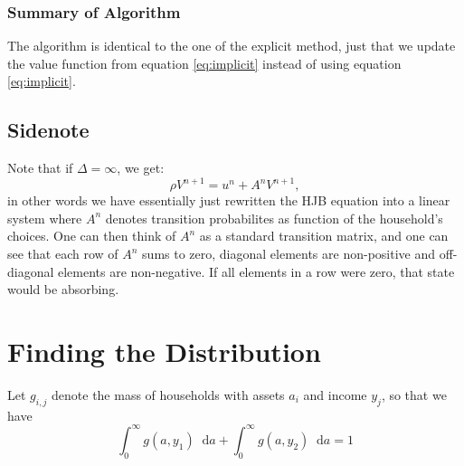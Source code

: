 \documentclass[12pt]{article}
\DeclareMathOperator{\1}{\mathbbm{1}}
\newcommand*\diff{\mathop{}\!\mathrm{d}}
\begin{document}
\subsubsection{Summary of Algorithm}
The algorithm is identical to the one of the explicit method, just that we update the value function from equation \eqref{eq:implicit} instead of using equation \ref{eq:implicit}.



\subsection{Sidenote}
Note that if $\Delta = \infty$, we get:
\begin{equation}
\rho V^{n+1} = u^n + A^n V^{n+1},
\end{equation}
in other words we have essentially just rewritten the HJB equation into a linear system where $A^n$ denotes transition probabilites  as function of the household's choices. One can then think of $A^n$ as a standard transition matrix, and one can see that each row of $A^n$ sums to zero, diagonal elements are non-positive and off-diagonal elements are non-negative. If all elements in a row were zero, that state would be absorbing.


\section{Finding the Distribution}
Let $g_{i,j}$ denote the mass of households with assets $a_i$ and income $y_j$, so that we have
\begin{equation}
\int_0^\infty g(a,y_1)\diff a + \int_0^\infty g(a,y_2)\diff a =1
\end{equation}
\end{document}
